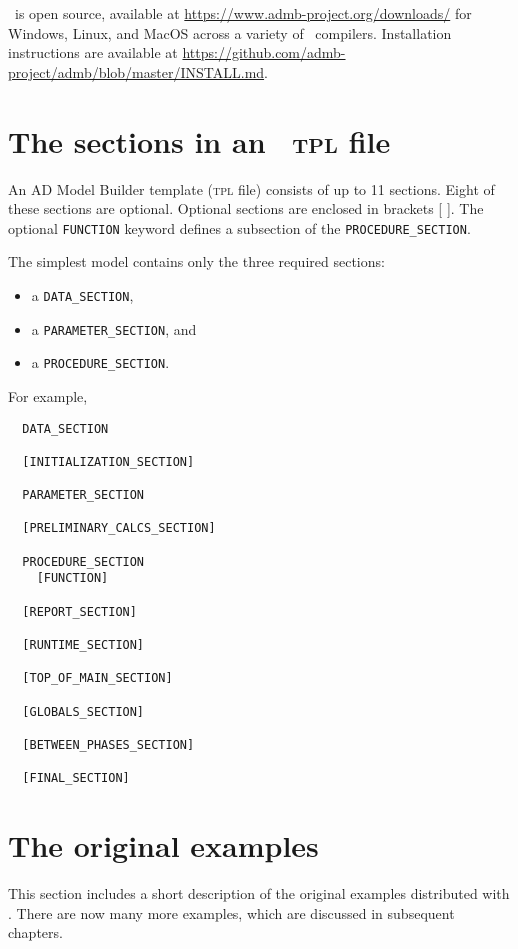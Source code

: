 \documentclass{admbmanual}
\newcommand\DS{\texttt{DATA\_SECTION}}
\newcommand\PS{\texttt{PARAMETER\_SECTION}}
\newcommand\PROS{\texttt{PROCEDURE\_SECTION}}
\begin{document}
\ADM\ is open source, available at \url{https://www.admb-project.org/downloads/}
for Windows, Linux, and MacOS across a variety of \cplus\ compilers.
Installation instructions are available at
\url{https://github.com/admb-project/admb/blob/master/INSTALL.md}.

\section{The sections in an \ADMS\ \textsc{tpl} file}

An AD Model Builder template (\textsc{tpl} file) consists of up to 11 sections.
Eight of these sections are optional. Optional sections are
enclosed in brackets [ ]. The optional \texttt{FUNCTION} keyword defines a
subsection of the \PROS.

The simplest model contains only the three required sections:
\begin{itemize}
  \item a \DS,
  \item a \PS, and
  \item a \PROS.
\end{itemize}

For example,
\begin{lstlisting}
  DATA_SECTION

  [INITIALIZATION_SECTION]

  PARAMETER_SECTION

  [PRELIMINARY_CALCS_SECTION]

  PROCEDURE_SECTION
    [FUNCTION]

  [REPORT_SECTION]

  [RUNTIME_SECTION]

  [TOP_OF_MAIN_SECTION]

  [GLOBALS_SECTION]

  [BETWEEN_PHASES_SECTION]

  [FINAL_SECTION]
\end{lstlisting}

\section{The original \ADMS examples}

This section includes a short description of the original examples distributed
with \ADM. There are now many more examples, which are discussed in subsequent
chapters.

\end{document}
